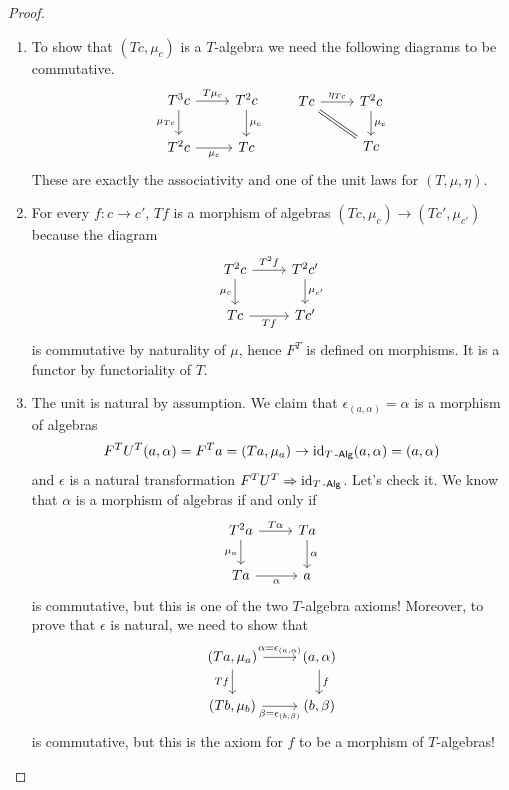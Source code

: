 \documentclass[a4paper,11pt,oneside,openany]{scrbook}
\begin{document}
\begin{proof}
	\begin{enumerate}[label=(\roman*)]
		\item To show that $(Tc, \mu_c)$ is a $T$-algebra we need the following diagrams to be commutative.
		\[
		\begin{tikzcd}
		T^3c\ar["\mu_{Tc}"', rightarrow]{d}\ar["T\mu_c", rightarrow]{r}
		& T^2c\ar["\mu_c", rightarrow]{d} \\
		T^2c\ar["\mu_c"', rightarrow]{r}
		& Tc
		\end{tikzcd}
		\quad\quad
		\begin{tikzcd}
		Tc\ar["\eta_{Tc}",rightarrow]{r}\ar[equal]{dr}
		& T^2c\ar["\mu_c", rightarrow]{d}
		\\
		& Tc
		\end{tikzcd}
		\]
		These are exactly the associativity and one of the unit laws for $(T, \mu, \eta)$.
	\item For every $f\colon c\to c'$, $Tf$ is a morphism of algebras $(Tc,\mu_c)\to(Tc', \mu_{c'})$ because the diagram 
		\[
	\begin{tikzcd}
	T^2c\ar["\mu_{c}"', rightarrow]{d}\ar["T^2f", rightarrow]{r}
	& T^2c'\ar["\mu_{c'}", rightarrow]{d} \\
	Tc\ar["Tf"', rightarrow]{r}
	& Tc'
	\end{tikzcd}
		\]
	is commutative by naturality of $\mu$, hence $F^T$ is defined on morphisms. It is a functor by functoriality of $T$.
	\item The unit is natural by assumption. We claim that $\epsilon_{(a,\alpha)}=\alpha$ is a morphism of algebras $$F^TU^T(a,\alpha)=F^Ta=(Ta,\mu_a) \to \operatorname{id}_{T\operatorname{-\mathsf{Alg}}}(a,\alpha)=(a,\alpha)$$ and $\epsilon$ is a natural transformation $F^TU^T\Rightarrow\operatorname{id}_{T\operatorname{-\mathsf{Alg}}}$. Let's check it. We know that $\alpha$ is a morphism of algebras if and only if 
	\[	
	\begin{tikzcd}
	T^2 a\ar["\mu_{a}"']{d}\ar["T\alpha"]{r}
	& Ta\ar["\alpha"]{d} \\
	Ta\ar["\alpha"']{r}
	& a
	\end{tikzcd}
	\]
	is commutative, but this is one of the two $T$-algebra axioms! Moreover, to prove that $\epsilon$ is natural, we need to show that
		\[	
	\begin{tikzcd}
	(Ta,\mu_a) \ar["Tf"']{d}\ar["\alpha=\epsilon_{(a,\alpha)}"]{r}
	& (a,\alpha)\ar["f"]{d} \\
	(Tb,\mu_b)\ar["\beta=\epsilon_{(b,\beta)}"']{r}
	& (b,\beta)
	\end{tikzcd}
	\]
	is commutative, but this is the axiom for $f$ to be a morphism of $T$-algebras! 

\end{enumerate}
\end{proof}
\end{document}
